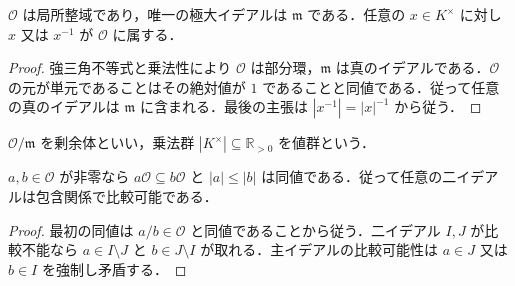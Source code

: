\begin{prop}[付値環の局所性]
$\mathcal O$ は局所整域であり，唯一の極大イデアルは $\mathfrak m$ である．任意の $x\in K^\times$ に対し $x$ 又は $x^{-1}$ が $\mathcal O$ に属する．
\end{prop}
\begin{proof}
強三角不等式と乗法性により $\mathcal O$ は部分環，$\mathfrak m$ は真のイデアルである．$\mathcal O$ の元が単元であることはその絶対値が $1$ であることと同値である．従って任意の真のイデアルは $\mathfrak m$ に含まれる．最後の主張は $|x^{-1}|=|x|^{-1}$ から従う．
\end{proof}
\begin{defn}[剰余体と値群]
$\mathcal O/\mathfrak m$ を剰余体といい，乗法群 $|K^\times|\subseteq\mathbb R_{>0}$ を値群という．
\end{defn}
\begin{prop}[付値環の主イデアルの比較]
$a,b\in\mathcal O$ が非零なら $a\mathcal O\subseteq b\mathcal O$ と $|a|\leq |b|$ は同値である．従って任意の二イデアルは包含関係で比較可能である．
\end{prop}
\begin{proof}
最初の同値は $a/b\in\mathcal O$ と同値であることから従う．二イデアル $I,J$ が比較不能なら $a\in I\setminus J$ と $b\in J\setminus I$ が取れる．主イデアルの比較可能性は $a\in J$ 又は $b\in I$ を強制し矛盾する．
\end{proof}
